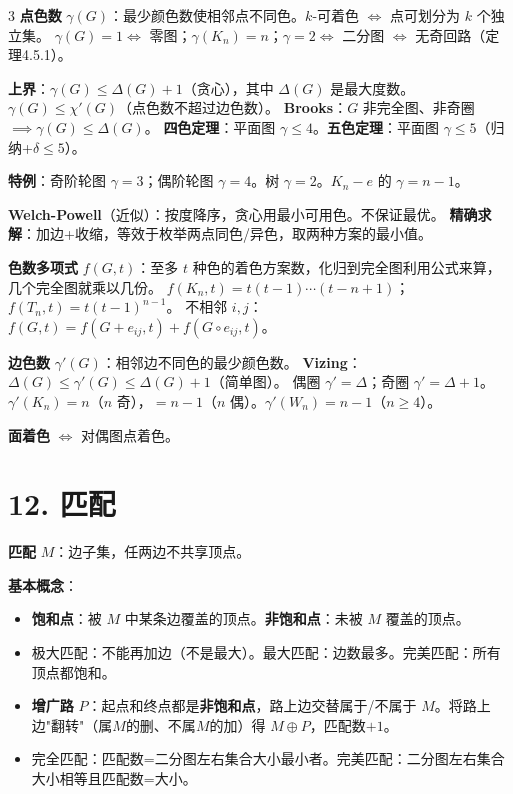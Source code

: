 \documentclass[10pt,a4paper,landscape]{ctexart}
\begin{document}
\begin{multicols}{3}
\textbf{点色数} $\gamma(G)$：最少颜色数使相邻点不同色。$k$-可着色 $\iff$ 点可划分为 $k$ 个独立集。
$\gamma(G)=1\iff$ 零图；$\gamma(K_n)=n$；$\gamma=2\iff$ 二分图 $\iff$ 无奇回路（定理4.5.1）。

\textbf{上界}：$\gamma(G)\leq\Delta(G)+1$（贪心），其中 $\Delta(G)$ 是最大度数。$\gamma(G)\leq\chi'(G)$（点色数不超过边色数）。
\textbf{Brooks}：$G$ 非完全图、非奇圈 $\implies \gamma(G)\leq\Delta(G)$。
\textbf{四色定理}：平面图 $\gamma\leq 4$。\textbf{五色定理}：平面图 $\gamma\leq 5$（归纳+$\delta\leq5$）。

\textbf{特例}：奇阶轮图 $\gamma=3$；偶阶轮图 $\gamma=4$。树 $\gamma=2$。$K_n-e$ 的 $\gamma=n-1$。

\textbf{Welch-Powell}（近似）：按度降序，贪心用最小可用色。不保证最优。
\textbf{精确求解}：加边+收缩，等效于枚举两点同色/异色，取两种方案的最小值。

\textbf{色数多项式} $f(G,t)$：至多 $t$ 种色的着色方案数，化归到完全图利用公式来算，几个完全图就乘以几份。
$f(K_n,t)=t(t-1)\cdots(t-n+1)$；$f(T_n,t)=t(t-1)^{n-1}$。
不相邻 $i,j$：$f(G,t)=f(G+e_{ij},t)+f(G\circ e_{ij},t)$。

\textbf{边色数} $\gamma'(G)$：相邻边不同色的最少颜色数。
\textbf{Vizing}：$\Delta(G)\leq\gamma'(G)\leq\Delta(G)+1$（简单图）。
偶圈 $\gamma'=\Delta$；奇圈 $\gamma'=\Delta+1$。
$\gamma'(K_n)=n$（$n$ 奇），$=n-1$（$n$ 偶）。$\gamma'(W_n)=n-1$（$n\geq 4$）。

\textbf{面着色} $\iff$ 对偶图点着色。

\section*{12. 匹配}

\textbf{匹配} $M$：边子集，任两边不共享顶点。

\textbf{基本概念}：
\begin{itemize}
\item \textbf{饱和点}：被 $M$ 中某条边覆盖的顶点。\textbf{非饱和点}：未被 $M$ 覆盖的顶点。
\item 极大匹配：不能再加边（不是最大）。最大匹配：边数最多。完美匹配：所有顶点都饱和。
\item \textbf{增广路} $P$：起点和终点都是\textbf{非饱和点}，路上边交替属于/不属于 $M$。将路上边"翻转"（属$M$的删、不属$M$的加）得 $M\oplus P$，匹配数$+1$。
\item 完全匹配：匹配数=二分图左右集合大小最小者。完美匹配：二分图左右集合大小相等且匹配数=大小。
\end{itemize}


\end{multicols}
\end{document}
